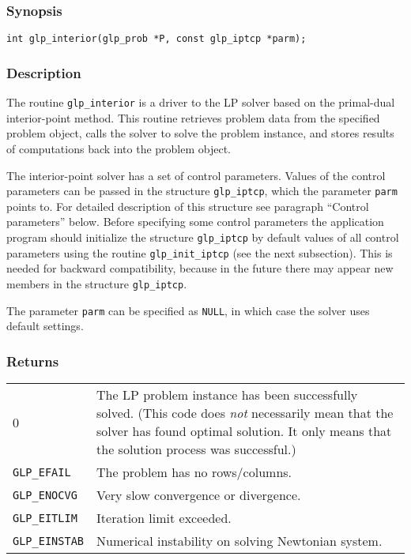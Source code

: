 \subsubsection*{Synopsis}

\begin{verbatim}
int glp_interior(glp_prob *P, const glp_iptcp *parm);
\end{verbatim}

\subsubsection*{Description}

The routine \verb|glp_interior| is a driver to the LP solver based on
the primal-dual interior-point method. This routine retrieves problem
data from the specified problem object, calls the solver to solve the
problem instance, and stores results of computations back into the
problem object.

The interior-point solver has a set of control parameters. Values of
the control parameters can be passed in the structure \verb|glp_iptcp|,
which the parameter \verb|parm| points to. For detailed description of
this structure see paragraph ``Control parameters'' below. Before
specifying some control parameters the application program should
initialize the structure \verb|glp_iptcp| by default values of all
control parameters using the routine \verb|glp_init_iptcp| (see the
next subsection). This is needed for backward compatibility, because in
the future there may appear new members in the structure
\verb|glp_iptcp|.

The parameter \verb|parm| can be specified as \verb|NULL|, in which
case the solver uses default settings.

\subsubsection*{Returns}

\def\arraystretch{1}

\begin{tabular}{@{}p{25mm}p{97.3mm}@{}}
0 & The LP problem instance has been successfully solved. (This code
does {\it not} necessarily mean that the solver has found optimal
solution. It only means that the solution process was successful.) \\
\verb|GLP_EFAIL| & The problem has no rows/columns.\\
\verb|GLP_ENOCVG| & Very slow convergence or divergence.\\
\verb|GLP_EITLIM| & Iteration limit exceeded.\\
\verb|GLP_EINSTAB| & Numerical instability on solving Newtonian
system.\\
\end{tabular}

